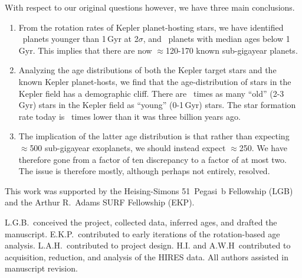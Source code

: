 \documentclass[11pt,twocolumn,tighten]{aastex63}
\begin{document}
With respect to our original questions however, we have 
three main conclusions.
\begin{enumerate}
  \item From the rotation rates of Kepler planet-hosting stars, we
    have identified  \nplyounggyrotwosigma\ planets younger than
    1\,Gyr at 2$\sigma$, and \nplyounggyro\ planets with median ages
    below 1\,Gyr.
    This implies that there are now $\approx$120-170 known
    sub-gigayear planets.
  \item Analyzing the age distributions of both the Kepler
    target stars and the known Kepler planet-hosts, we find that
    the age-distribution of stars in the Kepler field has a
    demographic cliff.  
    There are \ratioobtoybstars\ times as many ``old'' (2-3\,Gyr)
    stars in the Kepler field as ``young'' (0-1\,Gyr) stars.
    The star formation rate today is \ratiosfr\ times
    lower than it was three billion years ago.
  \item The implication of the latter age distribution is that rather
    than expecting $\approx$500 sub-gigayear exoplanets, we should
    instead expect $\approx$250.
    We have therefore gone from a factor of ten discrepancy to a
    factor of at most two.
    The issue is therefore mostly, although perhaps not entirely, resolved.
\end{enumerate}






\acknowledgements
This work was supported by the 
Heising-Simons 51~Pegasi~b Fellowship (LGB)
and the Arthur R.~Adams SURF Fellowship (EKP).

L.G.B.~conceived the project, collected data, 
inferred ages, and drafted the manuscript.
E.K.P.~contributed to early iterations of the rotation-based age analysis.
L.A.H.~contributed to project design.
H.I. and A.W.H~contributed to acquisition, reduction, and analysis of
the HIRES data.
All authors assisted in manuscript revision.



\end{document}
